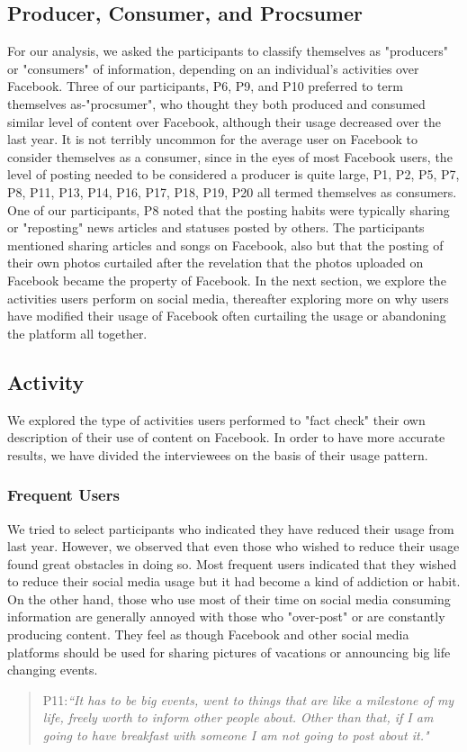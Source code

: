 \subsection{Producer, Consumer, and Procsumer}
For our analysis, we asked the participants to classify themselves as "producers" or "consumers" of information, depending on an individual's activities over Facebook. Three of our participants, P6, P9, and P10 preferred to term themselves as-"procsumer", who thought they both produced and consumed similar level of content over Facebook, although their usage decreased over the last year. It is not terribly uncommon for the average user on Facebook to consider themselves as a consumer, since in the eyes of most Facebook users, the level of posting needed to be considered a producer is quite large, P1, P2, P5, P7, P8, P11, P13, P14, P16, P17, P18, P19, P20 all termed themselves as consumers. One of our participants, P8 noted that the posting habits were typically sharing or "reposting" news articles and statuses posted by others. The participants mentioned sharing articles and songs on Facebook, also but that the posting of their own photos curtailed after the revelation that the photos uploaded on Facebook became the property of Facebook. In the next section, we explore the activities users perform on social media, thereafter exploring more on why users have modified their usage of Facebook often curtailing the usage or abandoning the platform all together.

\subsection{Activity}
We explored the type of activities users performed to "fact check" their own description of their use of content on Facebook. In order to have more accurate results, we have divided the interviewees on the basis of their usage pattern.
\subsubsection{Frequent Users}
We tried to select participants who indicated they have reduced their usage from last year. However, we observed that even those who wished to reduce their usage found great obstacles in doing so. Most frequent users indicated that they wished to reduce their social media usage but it had become a kind of addiction or habit. On the other hand, those who use most of their time on social media consuming information are generally annoyed with those who "over-post" or are constantly producing content. They feel as though Facebook and other social media platforms should be used for sharing pictures of vacations or announcing big life changing events.
\begin{quote}
P11:\textit{``It has to be big events, went to things that are like a milestone of my life, freely worth to inform other people about. Other than that, if I am going to have breakfast with someone I am not going to post about it."}
\end{quote}
